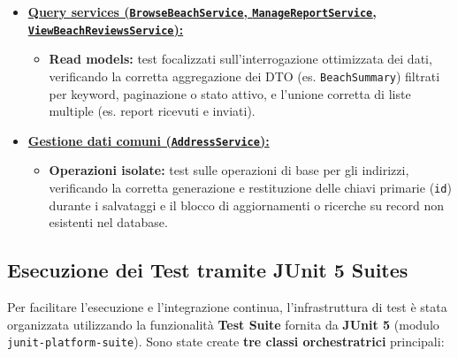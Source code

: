 \documentclass[a4paper,11pt]{article}
\begin{document}
\begin{itemize}[leftmargin=*]
\begin{itemize}[nosep]
		\item \textbf{Precondizioni rigorose:} un utente può lasciare una recensione (UC-07) o un report solo se il sistema certifica (tramite query su \texttt{BookingRepository}) un soggiorno effettivamente completato nel passato e l'assenza di provvedimenti disciplinari attivi;
		
		\item \textbf{Controllo di proprietà delle risorse:} verifica di sicurezza che impedisce a un utente di eliminare una recensione o un report non associato al proprio account.
	\end{itemize}
	
	\item \underline{\textbf{Query services (\texttt{BrowseBeachService}, \texttt{ManageReportService}, \texttt{ViewBeachReviewsService}):}}
	\label{itm:application_searches}
	\begin{itemize}[nosep]
		\item \textbf{Read models:} test focalizzati sull'interrogazione ottimizzata dei dati, verificando la corretta aggregazione dei DTO (es. \texttt{BeachSummary}) filtrati per keyword, paginazione o stato attivo, e l'unione corretta di liste multiple (es. report ricevuti e inviati).
	\end{itemize}
	
	\item \underline{\textbf{Gestione dati comuni (\texttt{AddressService}):}}
	\label{itm:application_common}
	\begin{itemize}[nosep]
		\item \textbf{Operazioni isolate:} test sulle operazioni di base per gli indirizzi, verificando la corretta generazione e restituzione delle chiavi primarie (\texttt{id}) durante i salvataggi e il blocco di aggiornamenti o ricerche su record non esistenti nel database.
	\end{itemize}
\end{itemize}

\subsection{Esecuzione dei Test tramite JUnit 5 Suites}
Per facilitare l'esecuzione e l'integrazione continua, l'infrastruttura di test è stata organizzata utilizzando la funzionalità \textbf{Test Suite} fornita da \textbf{JUnit 5} (modulo \texttt{junit-platform-suite}). Sono state create \textbf{tre classi orchestratrici} principali:
\end{document}
